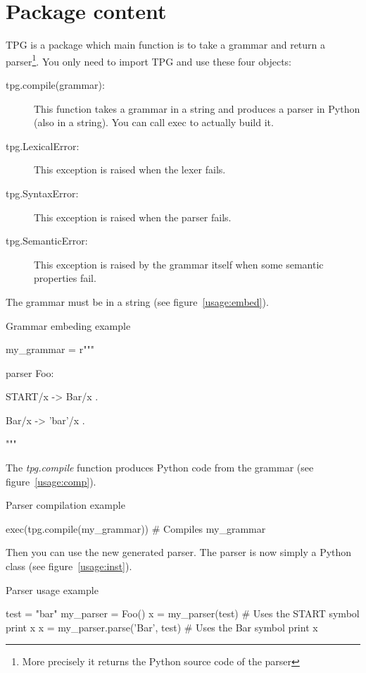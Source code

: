 \section{Package content}

TPG is a package which main function is to take a grammar and return a parser\footnote{More precisely it returns the Python source code of the parser}.
You only need to import TPG and use these four objects:

\begin{description}
	\item [tpg.compile(grammar):]
		This function takes a grammar in a string and produces
		a parser in Python (also in a string).
		You can call exec to actually build it. 
	\item [tpg.LexicalError:]
		This exception is raised when the lexer fails.
	\item [tpg.SyntaxError:]
		This exception is raised when the parser fails.
	\item [tpg.SemanticError:]
		This exception is raised by the grammar itself
		when some semantic properties fail.
\end{description}

The grammar must be in a string (see figure~\ref{usage:embed}).

\begin{code}
\caption{Grammar embeding example}							\label{usage:embed}
\begin{verbatimtab}[4]
	my_grammar = r"""

	parser Foo:

		START/x -> Bar/x .

		Bar/x -> 'bar'/x .

	"""
\end{verbatimtab}
\end{code}

The \emph{tpg.compile} function produces Python code from the grammar (see figure~\ref{usage:comp}).

\begin{code}
\caption{Parser compilation example}						\label{usage:comp}
\begin{verbatimtab}[4]
	exec(tpg.compile(my_grammar))    # Compiles my_grammar
\end{verbatimtab}
\end{code}

Then you can use the new generated parser. The parser is now simply a Python class (see figure~\ref{usage:inst}).

\begin{code}
\caption{Parser usage example}								\label{usage:inst}
\begin{verbatimtab}[4]
	test = "bar"
	my_parser = Foo()
	x = my_parser(test)               # Uses the START symbol
	print x
	x = my_parser.parse('Bar', test)  # Uses the Bar symbol
	print x
\end{verbatimtab}
\end{code}

